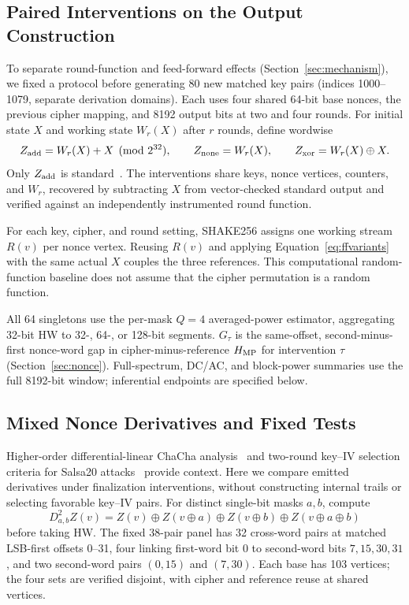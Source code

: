 \subsection{Paired Interventions on the Output Construction}\label{sec:ffmethods}

To separate round-function and feed-forward effects (Section~\ref{sec:mechanism}), we fixed a protocol before generating 80 new matched key pairs (indices 1000--1079, separate derivation domains). Each uses four shared 64-bit base nonces, the previous cipher mapping, and 8192 output bits at two and four rounds. For initial state $X$ and working state $W_r(X)$ after $r$ rounds, define wordwise
\begin{equation}
 Z_{\rm add}=W_r(X)+X\pmod{2^{32}},\qquad
 Z_{\rm none}=W_r(X),\qquad Z_{\rm xor}=W_r(X)\oplus X.
 \label{eq:ffvariants}
\end{equation}
Only $Z_{\rm add}$ is standard~\citep{bernstein2008salsa,bernstein2008chacha,nir2018}. The interventions share keys, nonce vertices, counters, and $W_r$, recovered by subtracting $X$ from vector-checked standard output and verified against an independently instrumented round function.

For each key, cipher, and round setting, SHAKE256 assigns one working stream $R(v)$ per nonce vertex. Reusing $R(v)$ and applying Equation~\eqref{eq:ffvariants} with the same actual $X$ couples the three references. This computational random-function baseline does not assume that the cipher permutation is a random function.

All 64 singletons use the per-mask $Q=4$ averaged-power estimator, aggregating 32-bit HW to 32-, 64-, or 128-bit segments. $G_\tau$ is the same-offset, second-minus-first nonce-word gap in cipher-minus-reference $H_{\rm MP}$ for intervention $\tau$ (Section~\ref{sec:nonce}). Full-spectrum, DC/AC, and block-power summaries use the full 8192-bit window; inferential endpoints are specified below.

\subsection{Mixed Nonce Derivatives and Fixed Tests}\label{sec:ffmixed}

Higher-order differential-linear ChaCha analysis~\citep{ghafoori2024hodl} and two-round key--IV selection criteria for Salsa20 attacks~\citep{dey2025tosc} provide context. Here we compare emitted derivatives under finalization interventions, without constructing internal trails or selecting favorable key--IV pairs. For distinct single-bit masks $a,b$, compute
\begin{equation}
 D^2_{a,b}Z(v)=Z(v)\oplus Z(v\oplus a)\oplus Z(v\oplus b)\oplus Z(v\oplus a\oplus b)
 \label{eq:ffderivative}
\end{equation}
before taking HW. The fixed 38-pair panel has 32 cross-word pairs at matched LSB-first offsets 0--31, four linking first-word bit 0 to second-word bits $7,15,30,31$, and two second-word pairs $(0,15)$ and $(7,30)$. Each base has 103 vertices; the four sets are verified disjoint, with cipher and reference reuse at shared vertices.


